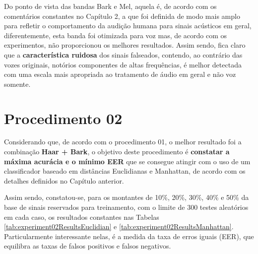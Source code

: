 	\par Do ponto de vista das bandas Bark e Mel, aquela é, de acordo com os comentários constantes no Capítulo 2, a que foi definida de modo mais amplo para refletir o comportamento da audição humana para sinais acústicos em geral, diferentemente, esta banda foi otimizada para voz mas, de acordo com os experimentos, não proporcionou os melhores resultados. Assim sendo, fica claro que a \textbf{característica ruidosa} dos sinais falseados, contendo, ao contrário das vozes originais, notórios componentes de altas frequências, é melhor detectada com uma escala mais apropriada ao tratamento de áudio em geral e não voz somente.
	
	\disableClearpage
	
	\section{Procedimento 02} \label{chap:testsResults:sec:Experimento02}
		\enableClearpage
	
		\par Considerando que, de acordo com o procedimento 01, o melhor resultado foi a combinação \textbf{Haar + Bark}, o objetivo deste procedimento é \textbf{constatar a máxima acurácia e o mínimo EER} que se consegue atingir com o uso de um classificador baseado em distâncias Euclidianas e Manhattan, de acordo com os detalhes definidos no Capítulo anterior.
		
		\par Assim sendo, constatou-se, para os montantes de 10\%, 20\%, 30\%, 40\% e 50\% da base de sinais reservados para treinamento, com o limite de 300 testes aleatórios em cada caso, os resultados constantes nas Tabelas \ref{tab:experiment02ResultsEuclidian} e \ref{tab:experiment02ResultsManhattan}. Particularmente interessante nelas, é a medida da taxa de erros iguais (EER), que equilibra as taxas de falsos positivos e falsos negativos. 
		
